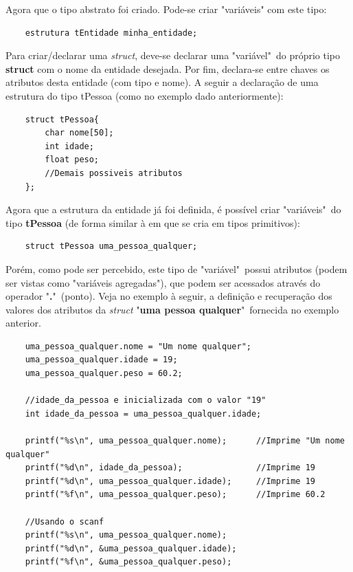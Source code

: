 \documentclass[12pt]{article}
\newcommand\tab[1][1cm]{\hspace*{#1}}
\begin{document}
\par\tab Agora que o tipo abstrato foi criado. Pode-se criar "variáveis" com este tipo:

\hspace{0.25cm}
\begin{lstlisting}
    estrutura tEntidade minha_entidade;
\end{lstlisting}

\par\tab Para criar/declarar uma \textit{struct}, deve-se declarar uma "variável"~do próprio tipo \textbf{struct} com o nome da entidade desejada. Por fim, declara-se entre chaves os atributos desta entidade (com tipo e nome). A seguir a declaração de uma estrutura do tipo tPessoa (como no exemplo dado anteriormente):

\hspace{0.25cm}
\begin{lstlisting}
    struct tPessoa{
        char nome[50];
        int idade;
        float peso;
        //Demais possiveis atributos
    };
\end{lstlisting}

\par\tab Agora que a estrutura da entidade já foi definida, é possível criar "variáveis"~do tipo \textbf{tPessoa} (de forma similar à em que se cria em tipos primitivos):

\hspace{0.25cm}
\begin{lstlisting}
    struct tPessoa uma_pessoa_qualquer;
\end{lstlisting}

\par\tab Porém, como pode ser percebido, este tipo de "variável"~possui atributos (podem ser vistas como "variáveis agregadas"), que podem ser acessados através do operador "\textbf{.}"~(ponto). Veja no exemplo à seguir, a definição e recuperação dos valores dos atributos da \textit{struct} "\textbf{uma pessoa qualquer}"~fornecida no exemplo anterior.

\hspace{0.25cm}
\begin{lstlisting}
    uma_pessoa_qualquer.nome = "Um nome qualquer";
    uma_pessoa_qualquer.idade = 19;
    uma_pessoa_qualquer.peso = 60.2;
    
    //idade_da_pessoa e inicializada com o valor "19"
    int idade_da_pessoa = uma_pessoa_qualquer.idade;
    
    printf("%s\n", uma_pessoa_qualquer.nome);      //Imprime "Um nome qualquer"
    printf("%d\n", idade_da_pessoa);               //Imprime 19
    printf("%d\n", uma_pessoa_qualquer.idade);     //Imprime 19
    printf("%f\n", uma_pessoa_qualquer.peso);      //Imprime 60.2
    
    //Usando o scanf
    printf("%s\n", uma_pessoa_qualquer.nome);
    printf("%d\n", &uma_pessoa_qualquer.idade);
    printf("%f\n", &uma_pessoa_qualquer.peso);
\end{lstlisting}
\end{document}

